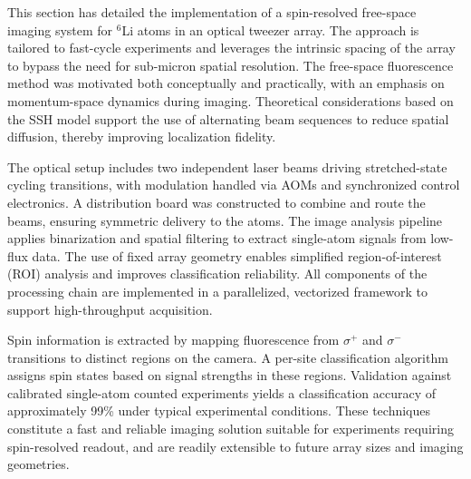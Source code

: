 
This section has detailed the implementation of a spin-resolved free-space imaging system for ${}^6$Li atoms in an optical tweezer array. The approach is tailored to fast-cycle experiments and leverages the intrinsic spacing of the array to bypass the need for sub-micron spatial resolution. 
% 
The free-space fluorescence method was motivated both conceptually and practically, with an emphasis on momentum-space dynamics during imaging. Theoretical considerations based on the SSH model support the use of alternating beam sequences to reduce spatial diffusion, thereby improving localization fidelity.

The optical setup includes two independent laser beams driving stretched-state cycling transitions, with modulation handled via AOMs and synchronized control electronics. A distribution board was constructed to combine and route the beams, ensuring symmetric delivery to the atoms. 
% 
The image analysis pipeline applies binarization and spatial filtering to extract single-atom signals from low-flux data. The use of fixed array geometry enables simplified region-of-interest (ROI) analysis and improves classification reliability. All components of the processing chain are implemented in a parallelized, vectorized framework to support high-throughput acquisition.

Spin information is extracted by mapping fluorescence from $\sigma^+$ and $\sigma^-$ transitions to distinct regions on the camera. A per-site classification algorithm assigns spin states based on signal strengths in these regions. Validation against calibrated single-atom counted experiments yields a classification accuracy of approximately 99\% under typical experimental conditions.
% 
These techniques constitute a fast and reliable imaging solution suitable for experiments requiring spin-resolved readout, and are readily extensible to future array sizes and imaging geometries.
